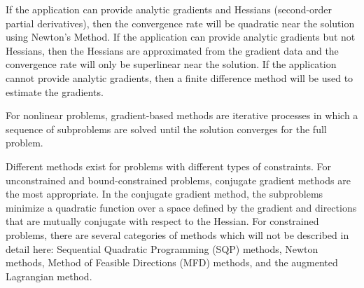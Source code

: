 If the application can provide analytic gradients and Hessians (second-order partial derivatives), then the convergence rate will be quadratic near the solution using Newton's Method.
If the application can provide analytic gradients but not Hessians, then the Hessians are approximated from the gradient data and the convergence rate will only be superlinear near the solution.
If the application cannot provide analytic gradients, then a finite difference method will be used to estimate the gradients.

For nonlinear problems, gradient-based methods are iterative processes in which a sequence of subproblems are solved until the solution converges for the full problem.

Different methods exist for problems with different types of constraints.
For unconstrained and bound-constrained problems, conjugate gradient methods are the most appropriate.
In the conjugate gradient method, the subproblems minimize a quadratic function over a space defined by the gradient and directions that are mutually conjugate with respect to the Hessian.
For constrained problems, there are several categories of methods which will not be described in detail here: Sequential Quadratic Programming (SQP) methods, Newton methods, Method of Feasible Directions (MFD) methods, and the augmented Lagrangian method.


